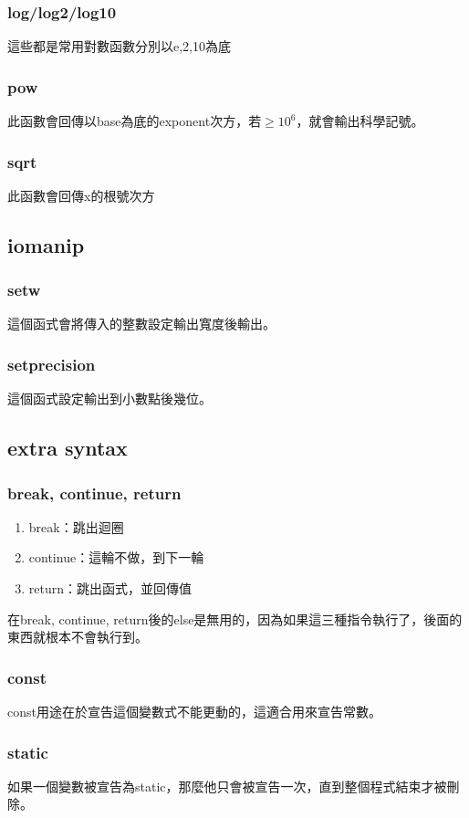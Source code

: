 \subsubsection{log/log2/log10}
這些都是常用對數函數分別以e,2,10為底

\subsubsection{pow}
此函數會回傳以base為底的exponent次方，若$\geq 10^6$，就會輸出科學記號。

\subsubsection{sqrt}
此函數會回傳x的根號次方

\subsection{iomanip}
\subsubsection{setw}
這個函式會將傳入的整數設定輸出寬度後輸出。

\subsubsection{setprecision}
這個函式設定輸出到小數點後幾位。

\subsection{extra syntax}
\subsubsection{break, continue, return}
\begin{enumerate}
\item break：跳出迴圈
\item continue：這輪不做，到下一輪
\item return：跳出函式，並回傳值
\end{enumerate}
在break, continue, return後的else是無用的，因為如果這三種指令執行了，後面的東西就根本不會執行到。
\subsubsection{const}
const用途在於宣告這個變數式不能更動的，這適合用來宣告常數。

\subsubsection{static}
如果一個變數被宣告為static，那麼他只會被宣告一次，直到整個程式結束才被刪除。

